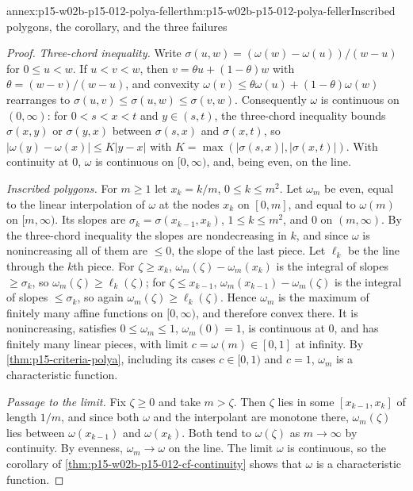 \begin{annexitem}{annex:p15-w02b-p15-012-polya-feller}{thm:p15-w02b-p15-012-polya-feller}{Inscribed polygons, the corollary, and the three failures}
\begin{proof}
\emph{Three-chord inequality.} Write \(\sigma(u,w)=(\omega(w)-\omega(u))/(w-u)\)
for \(0\leq u<w\). If \(u<v<w\), then \(v=\theta u+(1-\theta)w\) with
\(\theta=(w-v)/(w-u)\), and convexity
\(\omega(v)\leq\theta\omega(u)+(1-\theta)\omega(w)\) rearranges to
\(\sigma(u,v)\leq\sigma(u,w)\leq\sigma(v,w)\). Consequently \(\omega\) is
continuous on \((0,\infty)\): for \(0<s<x<t\) and \(y\in(s,t)\), the three-chord
inequality bounds \(\sigma(x,y)\) or \(\sigma(y,x)\) between \(\sigma(s,x)\)
and \(\sigma(x,t)\), so \(|\omega(y)-\omega(x)|\leq K|y-x|\) with
\(K=\max(|\sigma(s,x)|,|\sigma(x,t)|)\). With continuity at \(0\), \(\omega\)
is continuous on \([0,\infty)\), and, being even, on the line.

\emph{Inscribed polygons.} For \(m\geq1\) let \(x_k=k/m\), \(0\leq k\leq m^2\).
Let \(\omega_m\) be even, equal to the linear interpolation of \(\omega\) at the
nodes \(x_k\) on \([0,m]\), and equal to \(\omega(m)\) on \([m,\infty)\). Its
slopes are \(\sigma_k=\sigma(x_{k-1},x_k)\), \(1\leq k\leq m^2\), and \(0\) on
\((m,\infty)\). By the three-chord inequality the slopes are nondecreasing in
\(k\), and since \(\omega\) is nonincreasing all of them are \(\leq0\), the
slope of the last piece. Let \(\ell_k\) be the line through the \(k\)th piece.
For \(\zeta\geq x_k\), \(\omega_m(\zeta)-\omega_m(x_k)\) is the integral of
slopes \(\geq\sigma_k\), so \(\omega_m(\zeta)\geq\ell_k(\zeta)\); for
\(\zeta\leq x_{k-1}\), \(\omega_m(x_{k-1})-\omega_m(\zeta)\) is the integral of
slopes \(\leq\sigma_k\), so again \(\omega_m(\zeta)\geq\ell_k(\zeta)\). Hence
\(\omega_m\) is the maximum of finitely many affine functions on
\([0,\infty)\), and therefore convex there. It is nonincreasing, satisfies
\(0\leq\omega_m\leq1\), \(\omega_m(0)=1\), is continuous at \(0\), and has
finitely many linear pieces, with limit \(c=\omega(m)\in[0,1]\) at infinity.
By \cref{thm:p15-criteria-polya}, including its cases \(c\in[0,1)\) and
\(c=1\), \(\omega_m\) is a characteristic function.

\emph{Passage to the limit.} Fix \(\zeta\geq0\) and take \(m>\zeta\). Then
\(\zeta\) lies in some \([x_{k-1},x_k]\) of length \(1/m\), and since both
\(\omega\) and the interpolant are monotone there,
\(\omega_m(\zeta)\) lies between \(\omega(x_{k-1})\) and \(\omega(x_k)\). Both
tend to \(\omega(\zeta)\) as \(m\to\infty\) by continuity. By evenness,
\(\omega_m\to\omega\) on the line. The limit \(\omega\) is continuous, so the
corollary of \cref{thm:p15-w02b-p15-012-cf-continuity} shows that \(\omega\) is
a characteristic function.


\end{proof}
\end{annexitem}
